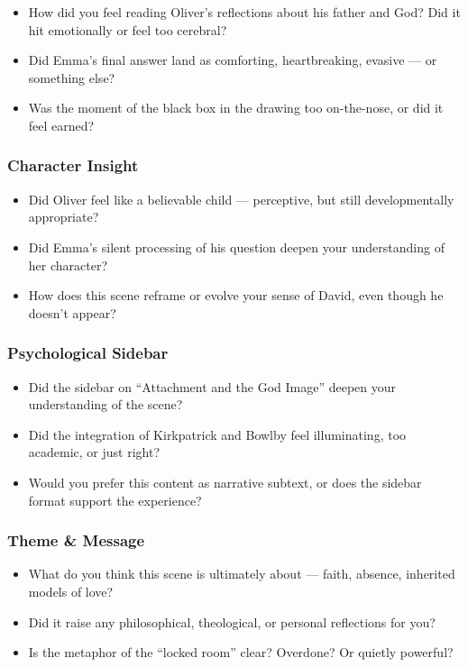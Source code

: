 \begin{itemize}
  \item How did you feel reading Oliver’s reflections about his father and God? Did it hit emotionally or feel too cerebral?
  \item Did Emma’s final answer land as comforting, heartbreaking, evasive — or something else?
  \item Was the moment of the black box in the drawing too on-the-nose, or did it feel earned?
\end{itemize}

\subsubsection*{Character Insight}

\begin{itemize}
  \item Did Oliver feel like a believable child — perceptive, but still developmentally appropriate?
  \item Did Emma’s silent processing of his question deepen your understanding of her character?
  \item How does this scene reframe or evolve your sense of David, even though he doesn’t appear?
\end{itemize}

\subsubsection*{Psychological Sidebar}

\begin{itemize}
  \item Did the sidebar on ``Attachment and the God Image'' deepen your understanding of the scene?
  \item Did the integration of Kirkpatrick and Bowlby feel illuminating, too academic, or just right?
  \item Would you prefer this content as narrative subtext, or does the sidebar format support the experience?
\end{itemize}

\subsubsection*{Theme \& Message}

\begin{itemize}
  \item What do you think this scene is ultimately about — faith, absence, inherited models of love?
  \item Did it raise any philosophical, theological, or personal reflections for you?
  \item Is the metaphor of the ``locked room'' clear? Overdone? Or quietly powerful?
\end{itemize}

